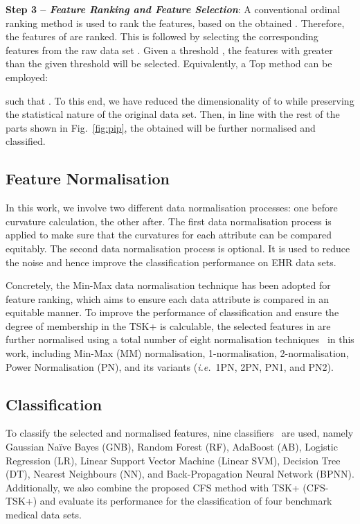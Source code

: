 \documentclass{article}
\newcommand{\zzie}{\emph{i.e.}~}
\newcommand*{\1}{\textcolor{magenta}}
\begin{document}
	\textbf{Step 3 -- \textit{Feature Ranking and Feature Selection}}: A conventional ordinal ranking method is used to rank the features, based on the obtained . Therefore, the features of  are ranked. This is followed by selecting the corresponding features from the raw data set . Given a threshold , the features with  greater than the given threshold  will be selected. Equivalently, a Top method can be employed:
	
	such that . To this end, we have reduced the dimensionality of  to  while preserving the statistical nature of the original data set. Then, in line with the rest of the parts shown in Fig.~\ref{fig:pip}, the obtained  will be further normalised and classified.
	
	\subsection{Feature Normalisation} \label{sec:featNorm}
	In this work, we involve two different data normalisation processes: one before curvature calculation, the other after. The first data normalisation process is applied to make sure that the curvatures for each attribute can be compared equitably. The second data normalisation process is optional. It is used to reduce the noise and hence improve the classification performance on EHR data sets. 
	
	Concretely, the Min-Max data normalisation technique has been adopted for feature ranking, which aims to ensure each data attribute is compared in an equitable manner. To improve the performance of classification and ensure the degree of membership in the TSK+ is calculable,
	the selected features in  are further normalised using a total number of eight normalisation techniques~\cite{8858838} in this work, including Min-Max (MM) normalisation, 1-normalisation, 2-normalisation, Power Normalisation (PN), and its variants (\zzie 1PN, 2PN, PN1, and PN2).
	
	\subsection{Classification} \label{sec:featClasf}
	To classify the selected and normalised features, nine classifiers~\cite{zuo2018grooming,8858838} are used, namely Gaussian Na\"ive Bayes (GNB), Random Forest (RF), AdaBoost (AB), Logistic Regression (LR), Linear Support Vector Machine (Linear SVM), Decision Tree (DT),  Nearest Neighbours (NN), and Back-Propagation Neural Network (BPNN). Additionally, we also combine the proposed CFS method with TSK+ (CFS-TSK+) and evaluate its performance for the classification of four benchmark medical data sets.
	
\end{document}
